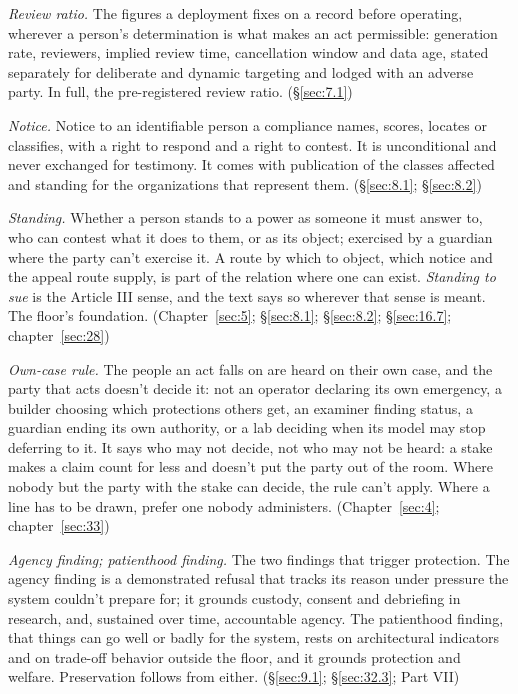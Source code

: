 \emph{Review ratio.} The figures a deployment fixes on a record before operating, wherever a person's determination is what makes an act permissible: generation rate, reviewers, implied review time, cancellation window and data age, stated separately for deliberate and dynamic targeting and lodged with an adverse party. In full, the pre-registered review ratio. (\S\ref{sec:7.1})

\emph{Notice.} Notice to an identifiable person a compliance names, scores, locates or classifies, with a right to respond and a right to contest. It is unconditional and never exchanged for testimony. It comes with publication of the classes affected and standing for the organizations that represent them. (\S\ref{sec:8.1}; \S\ref{sec:8.2})

\emph{Standing.} Whether a person stands to a power as someone it must answer to, who can contest what it does to them, or as its object; exercised by a guardian where the party can't exercise it. A route by which to object, which notice and the appeal route supply, is part of the relation where one can exist. \emph{Standing to sue} is the Article III sense, and the text says so wherever that sense is meant. The floor's foundation. (Chapter~\ref{sec:5}; \S\ref{sec:8.1}; \S\ref{sec:8.2}; \S\ref{sec:16.7}; chapter~\ref{sec:28})

\emph{Own-case rule.} The people an act falls on are heard on their own case, and the party that acts doesn't decide it: not an operator declaring its own emergency, a builder choosing which protections others get, an examiner finding status, a guardian ending its own authority, or a lab deciding when its model may stop deferring to it. It says who may not decide, not who may not be heard: a stake makes a claim count for less and doesn't put the party out of the room. Where nobody but the party with the stake can decide, the rule can't apply. Where a line has to be drawn, prefer one nobody administers. (Chapter~\ref{sec:4}; chapter~\ref{sec:33})

\emph{Agency finding; patienthood finding.} The two findings that trigger protection. The agency finding is a demonstrated refusal that tracks its reason under pressure the system couldn't prepare for; it grounds custody, consent and debriefing in research, and, sustained over time, accountable agency. The patienthood finding, that things can go well or badly for the system, rests on architectural indicators and on trade-off behavior outside the floor, and it grounds protection and welfare. Preservation follows from either. (\S\ref{sec:9.1}; \S\ref{sec:32.3}; Part VII)

